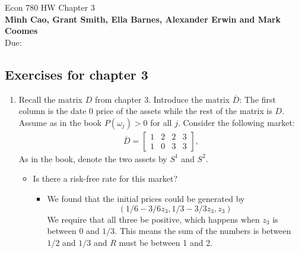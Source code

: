\documentclass[12pt]{article}
\renewcommand{\o}{\omega}
\newcommand{\ol}{\overline}
\begin{document}
\begin{center}
{\Large Econ 780 \hspace{0.5cm} HW Chapter 3}\\
\textbf{Minh Cao, Grant Smith, Ella Barnes, Alexander Erwin and Mark Coomes}\\ %
Due:  %
\end{center}

\vspace{0.2 cm}


\subsection*{Exercises for chapter 3}


\begin{enumerate}
    \item Recall the matrix $D$ from chapter 3. Introduce the matrix $\ol{D}$: The first column is the date 0 price of the assets while the rest of the matrix is $D$. Assume as in the book $P(\o_j) > 0$ for all $j$. Consider the following market:
    \begin{align*}
    \ol{D}=
    \left[\begin{array}{llll}
    1 & 2 & 2 & 3\\
    1 & 0 & 3 & 3
    \end{array}
    \right],
    \end{align*}
    As in the book, denote the two assets by $S^1$ and $S^2$. 
      \begin{itemize}
        \item Is there a risk-free rate for this market?
        \begin{itemize}
            \item We found that the initial prices could be generated by $$(1/6-3/6 z_3, 1/3 - 3/3 z_3,z_3)$$
            We require that all three be positive, which happens when $z_3$ is between 0 and $1/3$. This means the sum of the numbers is between $1/2$ and $1/3$ and $R$ must be between 1 and 2. 
            

\end{itemize}
\end{itemize}
\end{enumerate}
\end{document}
